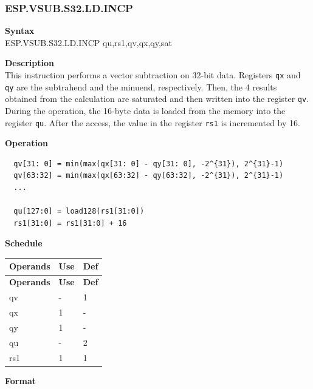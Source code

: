 \newpage
\subsubsection{ESP.VSUB.S32.LD.INCP}\label{instruction:ESPVSUBS32LDINCP}
\textbf{Syntax}\\
ESP.VSUB.S32.LD.INCP qu,rs1,qv,qx,qy,sat

\textbf{Description}\\
This instruction performs a vector subtraction on 32-bit data. Registers \lstinline{qx} and \lstinline{qy} are the subtrahend and the minuend, respectively. Then, the 4 results obtained from the calculation are saturated and then written into the register \lstinline{qv}. \\ During the operation, the 16-byte data is loaded from the memory into the register \lstinline{qu}. After the access, the value in the register \lstinline{rs1} is incremented by 16.

\textbf{Operation}\\
\begin{lstlisting}
  qv[31: 0] = min(max(qx[31: 0] - qy[31: 0], -2^{31}), 2^{31}-1)
  qv[63:32] = min(max(qx[63:32] - qy[63:32], -2^{31}), 2^{31}-1)
  ...

  qu[127:0] = load128(rs1[31:0])
  rs1[31:0] = rs1[31:0] + 16
\end{lstlisting}


\textbf{Schedule}\\
\begin{longtable}[c]{|l|l|l|}
    \hline
    \rowcolor{lightgray}
    \textbf{Operands} & \textbf{Use} & \textbf{Def} \\\hline
    \endfirsthead
    \hline
    \rowcolor{lightgray}
     \textbf{Operands} & \textbf{Use} & \textbf{Def} \\\hline
    \endhead
    \hline
    \endfoot

  qv & - & 1 \\\hline
    qx & 1 & - \\\hline
    qy & 1 & - \\\hline
    qu & - & 2 \\\hline
    rs1 & 1 & 1

\end{longtable}

\textbf{Format}\\

